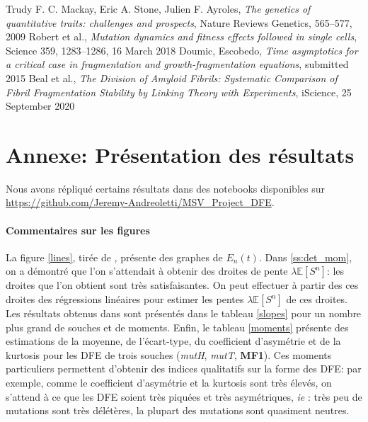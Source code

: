 \documentclass[12pt]{article}
\newcommand{\cro}[1]{\left[#1\right]}
\newcommand{\ie}{\emph{ie} }
\newcommand{\Esp}[1]{\mathbb{E}\cro{#1}}
\begin{document}
\newpage

\begin{thebibliography}{1}

  Trudy F. C. Mackay, Eric A. Stone, Julien F. Ayroles,
  \emph{The genetics of quantitative traits: challenges and prospects}, Nature Reviews Genetics, 565–577, 2009
  Robert et al.,
  \emph{Mutation dynamics and fitness effects followed in single cells}, Science 359, 1283–1286, 16 March 2018
  Doumic, Escobedo,
  \emph{Time asymptotics for a critical case in fragmentation and growth-fragmentation equations}, submitted 2015
  Beal et al.,
  \emph{The Division of Amyloid Fibrils: Systematic Comparison of Fibril Fragmentation Stability by Linking Theory with Experiments}, iScience, 25 September 2020
\end{thebibliography}





\newpage

\appendix

\FloatBarrier
\section{Annexe: Présentation des résultats}\label{ann:resultats}

Nous avons répliqué certains résultats dans des notebooks disponibles sur \url{https://github.com/Jeremy-Andreoletti/MSV_Project_DFE}.
%

\paragraph{Commentaires sur les figures} La figure \ref{lines}, tirée de \cite{rob}, présente des graphes de $E_n(t)$. Dans \ref{ss:det_mom}, on a démontré que l'on s'attendait à obtenir des droites de pente $\lambda\Esp{S^n}$: les droites que l'on obtient sont très satisfaisantes. On peut effectuer à partir des ces droites des régressions linéaires pour estimer  les pentes $\lambda\Esp{S^n}$ de ces droites. Les résultats obtenus dans \cite{rob} sont présentés dans le tableau \ref{slopes} pour un nombre plus grand de souches et de moments. Enfin, le tableau \ref{moments} présente des estimations de la moyenne, de l'écart-type, du coefficient d'asymétrie et de la kurtosis pour les DFE de trois souches (\emph{mutH}, \emph{mutT}, \textbf{MF1}). Ces moments particuliers permettent d'obtenir des indices qualitatifs sur la forme des DFE: par exemple, comme le coefficient d'asymétrie et la kurtosis sont très élevés, on s'attend à ce que les DFE soient très piquées et très asymétriques, \ie: très peu de mutations sont très délétères, la plupart des mutations sont quasiment neutres.
\end{document}
